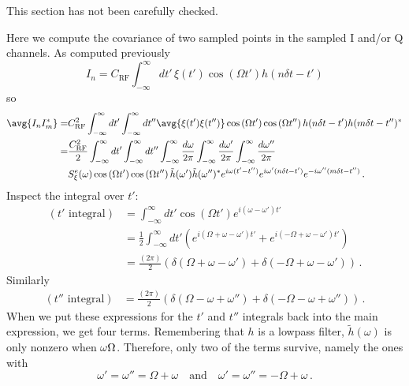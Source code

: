 
This section has not been carefully checked.

Here we compute the covariance of two sampled points in the sampled I and/or Q channels.
As computed previously
\begin{equation}
  I_n = C_\text{RF} \int_{-\infty}^\infty dt' \, \xi(t') \cos \left( \Omega t' \right) h(n \delta t - t')
\end{equation}
so
\begin{align}
  \avg{I_n I_m^*}
  =& C_\text{RF}^2 \int_{-\infty}^\infty dt' \int_{-\infty}^\infty dt''
    \avg{\xi(t') \xi(t'')} \cos \left( \Omega t' \right) \cos \left(\Omega t'' \right) h(n \delta t - t') h(m \delta t - t'')^*
    \nonumber \\
  =& \frac{C_\text{RF}^2}{2} \int_{-\infty}^\infty dt' \int_{-\infty}^\infty dt''
    \int_{-\infty}^\infty \frac{d\omega}{2\pi} \int_{-\infty}^\infty \frac{d\omega'}{2\pi} \int_{-\infty}^\infty \frac{d\omega''}{2\pi} \nonumber \\
    & S_{\xi}^e(\omega) \cos \left( \Omega t' \right) \cos \left(\Omega t'' \right) \tilde{h}(\omega') \tilde{h}(\omega'')^*
    e^{i \omega (t' - t'')} e^{i \omega'(n \delta t - t')} e^{-i \omega''(m \delta t - t'')}
    \, .
\end{align}
Inspect the integral over $t'$:
\begin{align}
  (t' \text{ integral})
  &= \int_{-\infty}^\infty dt' \cos(\Omega t') e^{i (\omega - \omega') t'} \nonumber \\
  &= \frac{1}{2} \int_{-\infty}^\infty dt'
    \left( e^{i (\Omega + \omega - \omega') t'} + e^{i  (-\Omega + \omega - \omega') t'} \right) \nonumber \\
  &= \frac{(2\pi)}{2} \left( \delta(\Omega + \omega - \omega') + \delta(-\Omega + \omega - \omega') \right)
  \, .
\end{align}
Similarly
\begin{align}
  (t'' \text{ integral})
  &= \frac{(2\pi)}{2} \left( \delta(\Omega - \omega + \omega'') + \delta(-\Omega - \omega + \omega'') \right)
  \, .
\end{align}
When we put these expressions for the $t'$ and $t''$ integrals back into the main expression, we get four terms.
Remembering that $h$ is a lowpass filter, $\tilde{h}(\omega)$ is only nonzero when $\omega \\ \Omega$.
Therefore, only two of the terms survive, namely the ones with
\begin{equation}
  \omega' = \omega'' = \Omega + \omega
  \quad \text{and} \quad
  \omega' = \omega'' = - \Omega + \omega
  \, .
\end{equation}
